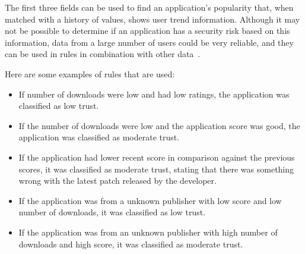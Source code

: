 The first three fields can be used to find an application’s
popularity that, when matched with a history of values, shows
user trend information.  Although it may not be possible to determine if an
application has a security risk based on this
information, data from a large number of users could be very reliable, and 
they can be used in rules in combination with other data~\cite{jing2014riskmon}.

Here are some examples of rules that are used: 
\begin{itemize}
  \item If number of downloads were low and had low ratings, the
    application was classified as low trust.
  \item If the number of downloads were low and the application
    score was good, the application was classified as moderate trust.
  \item If the application had lower recent score in comparison 
  against the previous scores, it was classified as moderate 
  trust, stating that there was something wrong with the latest patch 
  released by the developer. 
  \item If the application was from a unknown publisher with low score
    and low number of downloads, it was classified as low trust.
  \item If the application was from an unknown publisher with high
    number of downloads and high score, it was classified as moderate trust.
\end{itemize}
